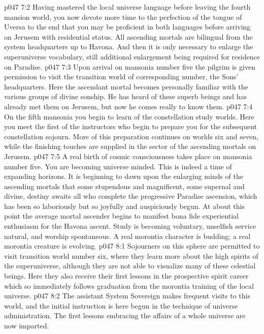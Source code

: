 \vs p047 7:2 Having mastered the local universe language before leaving the fourth mansion world, you now devote more time to the perfection of the tongue of Uversa to the end that you may be proficient in both languages before arriving on Jerusem with residential status. All ascending mortals are bilingual from the system headquarters up to Havona. And then it is only necessary to enlarge the superuniverse vocabulary, still additional enlargement being required for residence on Paradise.
\vs p047 7:3 Upon arrival on mansonia number five the pilgrim is given permission to visit the transition world of corresponding number, the Sons’ headquarters. Here the ascendant mortal becomes personally familiar with the various groups of divine sonship. He has heard of these superb beings and has already met them on Jerusem, but now he comes really to know them.
\vs p047 7:4 On the fifth mansonia you begin to learn of the constellation study worlds. Here you meet the first of the instructors who begin to prepare you for the subsequent constellation sojourn. More of this preparation continues on worlds six and seven, while the finishing touches are supplied in the sector of the ascending mortals on Jerusem.
\vs p047 7:5 A real birth of cosmic consciousness takes place on mansonia number five. You are becoming universe minded. This is indeed a time of expanding horizons. It is beginning to dawn upon the enlarging minds of the ascending mortals that some stupendous and magnificent, some supernal and divine, destiny awaits all who complete the progressive Paradise ascension, which has been so laboriously but so joyfully and auspiciously begun. At about this point the average mortal ascender begins to manifest bona fide experiential enthusiasm for the Havona ascent. Study is becoming voluntary, unselfish service natural, and worship spontaneous. A real morontia character is budding; a real morontia creature is evolving.
\vs p047 8:1 Sojourners on this sphere are permitted to visit transition world number six, where they learn more about the high spirits of the superuniverse, although they are not able to visualize many of these celestial beings. Here they also receive their first lessons in the prospective spirit career which so immediately follows graduation from the morontia training of the local universe.\plusone
\vs p047 8:2 The assistant System Sovereign makes frequent visits to this world, and the initial instruction is here begun in the technique of universe administration. The first lessons embracing the affairs of a whole universe are now imparted.

